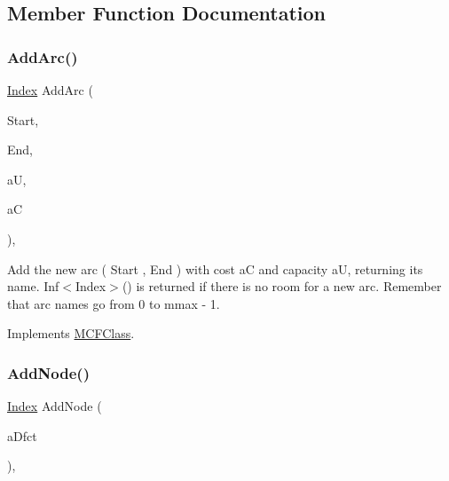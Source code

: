 \subsection{Member Function Documentation}
\mbox{\label{class_m_c_f_cplex_a57e7641179f820974444701d4f179fb6}} 
\subsubsection{\texorpdfstring{Add\+Arc()}{AddArc()}}
{\footnotesize\ttfamily \mbox{\hyperlink{class_m_c_f_class_ad53d6229d7ec28555a9c9c2fd9abf773}{Index}} Add\+Arc (\begin{DoxyParamCaption}\item[{\mbox{\hyperlink{class_m_c_f_class_a76aaabb20535c51a2752b93f6c38fe54}{c\+Index}}}]{Start,  }\item[{\mbox{\hyperlink{class_m_c_f_class_a76aaabb20535c51a2752b93f6c38fe54}{c\+Index}}}]{End,  }\item[{\mbox{\hyperlink{class_m_c_f_class_a11f747fbdff346237c8db4469d569994}{c\+F\+Number}}}]{aU,  }\item[{\mbox{\hyperlink{class_m_c_f_class_a07dbefeeb08c3f63073622411893eb76}{c\+C\+Number}}}]{aC }\end{DoxyParamCaption})\hspace{0.3cm}{\ttfamily [override]}, {\ttfamily [virtual]}}

Add the new arc ( Start , End ) with cost aC and capacity aU, returning its name. Inf$<$\+Index$>$() is returned if there is no room for a new arc. Remember that arc names go from 0 to mmax -\/ 1. 

Implements \mbox{\hyperlink{class_m_c_f_class_a564d624f62ccc0c130d733cc5470cb6d}{M\+C\+F\+Class}}.

\mbox{\label{class_m_c_f_cplex_a3b1944c7daf09b4e72cc2eeda39e335d}} 
\subsubsection{\texorpdfstring{Add\+Node()}{AddNode()}}
{\footnotesize\ttfamily \mbox{\hyperlink{class_m_c_f_class_ad53d6229d7ec28555a9c9c2fd9abf773}{Index}} Add\+Node (\begin{DoxyParamCaption}\item[{\mbox{\hyperlink{class_m_c_f_class_a11f747fbdff346237c8db4469d569994}{c\+F\+Number}}}]{a\+Dfct }\end{DoxyParamCaption})\hspace{0.3cm}{\ttfamily [override]}, {\ttfamily [virtual]}}

